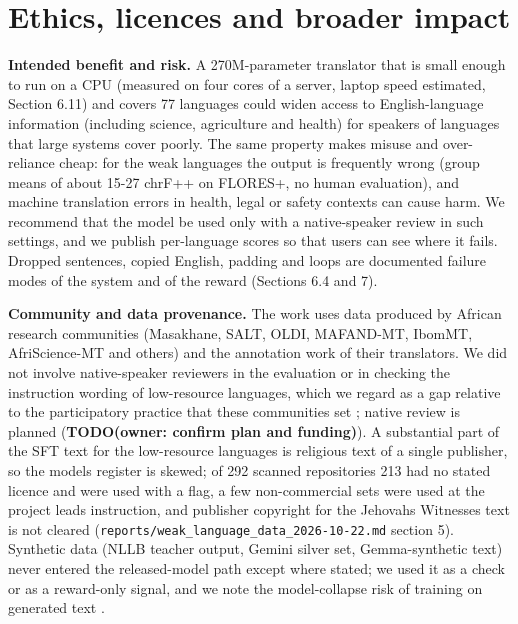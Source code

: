 \section{Ethics, licences and broader impact}\label{ethics-licences-and-broader-impact}

\textbf{Intended benefit and risk.} A 270M-parameter translator that is small enough to run on a CPU (measured on four cores of a server, laptop speed estimated, Section 6.11) and covers 77 languages could widen access to English-language information (including science, agriculture and health) for speakers of languages that large systems cover poorly. The same property makes misuse and over-reliance cheap: for the weak languages the output is frequently wrong (group means of about 15-27 chrF++ on FLORES+, no human evaluation), and machine translation errors in health, legal or safety contexts can cause harm. We recommend that the model be used only with a native-speaker review in such settings, and we publish per-language scores so that users can see where it fails. Dropped sentences, copied English, padding and loops are documented failure modes of the system and of the reward (Sections 6.4 and 7).

\textbf{Community and data provenance.} The work uses data produced by African research communities (Masakhane, SALT, OLDI, MAFAND-MT, IbomMT, AfriScience-MT and others) and the annotation work of their translators. We did not involve native-speaker reviewers in the evaluation or in checking the instruction wording of low-resource languages, which we regard as a gap relative to the participatory practice that these communities set \citep{nekoto2020participatory}; native review is planned ({\color{red}\textbf{TODO(owner: confirm plan and funding)}}). A substantial part of the SFT text for the low-resource languages is religious text of a single publisher, so the model\textquotesingle s register is skewed; of 292 scanned repositories 213 had no stated licence and were used with a flag, a few non-commercial sets were used at the project lead\textquotesingle s instruction, and publisher copyright for the Jehovah\textquotesingle s Witnesses text is not cleared (\texttt{reports/weak\_language\_data\_2026-10-22.md} section 5). Synthetic data (NLLB teacher output, Gemini silver set, Gemma-synthetic text) never entered the released-model path except where stated; we used it as a check or as a reward-only signal, and we note the model-collapse risk of training on generated text \citep{shumailov2023curse}.


